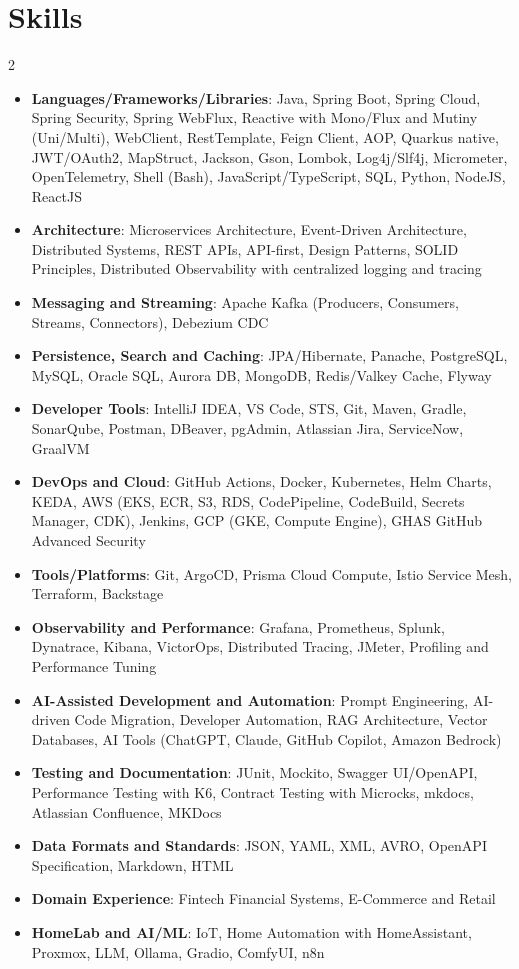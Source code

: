 \documentclass[a4paper,20pt]{article}
\newcommand{\resumeItem}[2]{
  \item\small{
    \textbf{#1}{: #2 \vspace{-2pt}}
  }
}
\newcommand{\resumeSubHeadingListStart}{\begin{itemize}[leftmargin=*]}
\newcommand{\resumeSubHeadingListEnd}{\end{itemize}}
\begin{document}
\section{Skills}
\begin{multicols}{2}
  \resumeSubHeadingListStart
    \resumeItem{Languages/Frameworks/Libraries}
      {Java, Spring Boot, Spring Cloud, Spring Security, Spring WebFlux, Reactive with Mono/Flux and Mutiny (Uni/Multi), WebClient, RestTemplate, Feign Client, AOP, Quarkus native, JWT/OAuth2, MapStruct, Jackson, Gson, Lombok, Log4j/Slf4j, Micrometer, OpenTelemetry, Shell (Bash), JavaScript/TypeScript, SQL, Python, NodeJS, ReactJS}
    \resumeItem{Architecture}
      {Microservices Architecture, Event-Driven Architecture, Distributed Systems, REST APIs, API-first, Design Patterns, SOLID Principles, Distributed Observability with centralized logging and tracing}
    \resumeItem{Messaging and Streaming}
      {Apache Kafka (Producers, Consumers, Streams, Connectors), Debezium CDC}
    \resumeItem{Persistence, Search and Caching}
      {JPA/Hibernate, Panache, PostgreSQL, MySQL, Oracle SQL, Aurora DB, MongoDB, Redis/Valkey Cache, Flyway}
    \resumeItem{Developer Tools}
      {IntelliJ IDEA, VS Code, STS, Git, Maven, Gradle, SonarQube, Postman, DBeaver, pgAdmin, Atlassian Jira, ServiceNow, GraalVM}
    \resumeItem{DevOps and Cloud}
      {GitHub Actions, Docker, Kubernetes, Helm Charts, KEDA, AWS (EKS, ECR, S3, RDS, CodePipeline, CodeBuild, Secrets Manager, CDK), Jenkins, GCP (GKE, Compute Engine), GHAS GitHub Advanced Security}
    \resumeItem{Tools/Platforms}
      {Git, ArgoCD, Prisma Cloud Compute, Istio Service Mesh, Terraform, Backstage}
    \resumeItem{Observability and Performance}
      {Grafana, Prometheus, Splunk, Dynatrace, Kibana, VictorOps, Distributed Tracing, JMeter, Profiling and Performance Tuning}
    \resumeItem{AI-Assisted Development and Automation}
      {Prompt Engineering, AI-driven Code Migration, Developer Automation, RAG Architecture, Vector Databases, AI Tools (ChatGPT, Claude, GitHub Copilot, Amazon Bedrock)}
    \resumeItem{Testing and Documentation}
      {JUnit, Mockito, Swagger UI/OpenAPI, Performance Testing with K6, Contract Testing with Microcks, mkdocs, Atlassian Confluence, MKDocs}
    \resumeItem{Data Formats and Standards}
      {JSON, YAML, XML, AVRO, OpenAPI Specification, Markdown, HTML}
    \resumeItem{Domain Experience}
      {Fintech Financial Systems, E-Commerce and Retail}
    \resumeItem{HomeLab and AI/ML}
      {IoT, Home Automation with HomeAssistant, Proxmox, LLM, Ollama, Gradio, ComfyUI, n8n}
  \resumeSubHeadingListEnd
\end{multicols}
\end{document}
